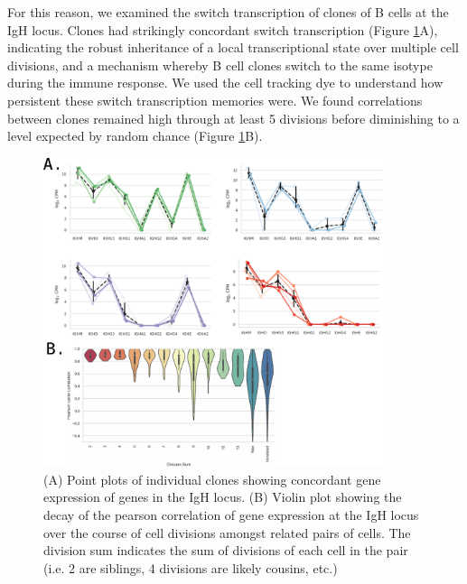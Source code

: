 For this reason, we examined the switch transcription of clones of B cells at the IgH locus. Clones had strikingly concordant switch transcription  (Figure \ref{fig:paper2_Igh_concordance}A), indicating the robust inheritance of a local transcriptional state over multiple cell divisions, and a mechanism whereby B cell clones switch to the same isotype during the immune response. We used the cell tracking dye to understand how persistent these switch transcription memories were. We found correlations between clones remained high through at least 5 divisions before diminishing to a level expected by random chance  (Figure \ref{fig:paper2_Igh_concordance}B).
\begin{figure}[htb!]
\centering
\includegraphics[width=10cm, keepaspectratio]{figs/prelim_InVitro/prelim_IgH_concordance.pdf}
\caption[Concordant switch transcription states at the IgH locus between exemplary clones]{(A) Point plots of individual clones showing concordant gene expression of genes in the IgH locus. (B) Violin plot showing the decay of the pearson correlation of gene expression at the IgH locus over the course of cell divisions amongst related pairs of cells. The division sum indicates the sum of divisions of each cell in the pair (i.e. 2 are siblings, 4 divisions are likely cousins, etc.)}
\label{fig:paper2_Igh_concordance}
\end{figure}

